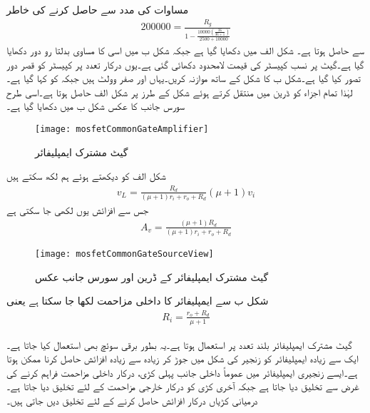 مساوات  کی مدد سے  حاصل کرنے کی خاطر
\begin{align*}
200000 = \frac{R_g}{1-\frac{10000 \left(\frac{36}{36+1} \right)}{2500+10000}}
\end{align*}
سے  حاصل ہوتا ہے۔
شکل  الف میں  دکھایا گیا ہے جبکہ شکل  ب میں اسی کا مساوی بدلتا رو دور دکھایا گیا ہے۔گیٹ پر نسب کپیسٹر کی قیمت لامحدود دکھائی گئی ہے۔یوں درکار تعدد پر کپیسٹر کو قصر دور تصور کیا گیا ہے۔شکل  ب کا شکل  کے ساتھ موازنہ کریں۔یہاں  اور  صفر وولٹ ہیں جبکہ  کو  کہا گیا ہے۔لہٰذا تمام اجزاء کو ڈرین میں منتقل کرتے ہوئے شکل  کے طرز پر  شکل  الف حاصل ہوتا ہے۔اسی طرح سورس جانب کا عکس شکل  ب میں دکھایا گیا ہے۔ 
\begin{figure}
\centering
\texttt{[image: mosfetCommonGateAmplifier]}
\caption{گیٹ مشترک ایمپلیفائر}
\label{شکل_ماسفیٹ_قابو_مشترک_ایمپلیفائر}
\end{figure}

شکل  الف کو دیکھتے ہوئے ہم لکھ سکتے ہیں
\begin{align*}
v_L=\frac{R_d}{\left(\mu+1 \right) r_i+r_o+R_d} \left(\mu+1 \right) v_i
\end{align*}
جس سے افزائش  یوں لکھی جا سکتی ہے
\begin{align*}
A_v=\frac{\left(\mu+1 \right)R_d}{\left(\mu+1 \right) r_i+r_o+R_d} 
\end{align*}
%
\begin{figure}
\centering
\texttt{[image: mosfetCommonGateSourceView]}
\caption{گیٹ مشترک ایمپلیفائر کے ڈرین اور سورس جانب عکس}
\label{شکل_ماسفیٹ_قابو_مشترک_ایمپلیفائر_عکس}
\end{figure}

شکل  ب سے ایمپلیفائر کا داخلی مزاحمت لکھا جا سکتا ہے یعنی
\begin{align*}
R_i=\frac{r_o+R_d}{\mu+1}
\end{align*}

گیٹ مشترک ایمپلیفائر بلند تعدد پر استعمال ہوتا ہے۔یہ بطور برقی سوئچ بھی استعمال کیا جاتا ہے۔
ایک سے زیادہ ایمپلیفائر کو زنجیر کی شکل میں جوڑ کر زیادہ سے زیادہ افزائش حاصل کرنا ممکن ہوتا ہے۔ایسے زنجیری ایمپلیفائر میں عموماً داخلی جانب پہلی کڑی،  درکار داخلی مزاحمت فراہم کرنے کی غرض سے تخلیق دیا جاتا ہے جبکہ آخری کڑی کو درکار خارجی مزاحمت کے لئے تخلیق دیا جاتا ہے۔درمیانی کڑیاں درکار افزائش حاصل کرنے کے لئے تخلیق دیں جاتی ہیں۔
 

